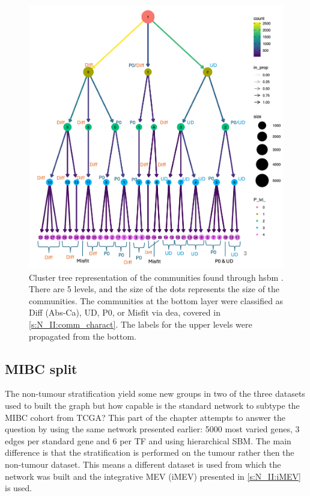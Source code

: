 
\begin{figure}[H]    
    \centering
    \includegraphics[width=1.0\textwidth,height=1.0\textheight,keepaspectratio]{Sections/Network_II/resources/non_tum/clustertree_labels.png}
    \caption{Cluster tree representation of the communities found through \acrfull{hsbm} \citet{Peixoto2014-yb}. There are 5 levels, and the size of the dots represents the size of the communities. The communities at the bottom layer were classified as Diff (Abs-Ca), UD, P0, or Misfit via \acrfull{dea}, covered in \cref{s:N_II:comm_charact}. The labels for the upper levels were propagated from the bottom.}
    \label{fig:N_II:cluster_tree}
\end{figure}



% 
\subsection{MIBC split} \label{s:N_II:tum_split}

The non-tumour stratification yield some new groups in two of the three datasets used to built the graph but how capable is the standard network to subtype the MIBC cohort from TCGA? This part of the chapter attempts to answer the question by using the same network presented earlier: 5000 most varied genes, 3 edges per standard gene and 6 per TF and using hierarchical SBM. The main difference is that the stratification is performed on the tumour rather then the non-tumour dataset. This means a different dataset is used from which the network was built and the integrative MEV (iMEV) presented in \cref{s:N_II:iMEV} is used.


